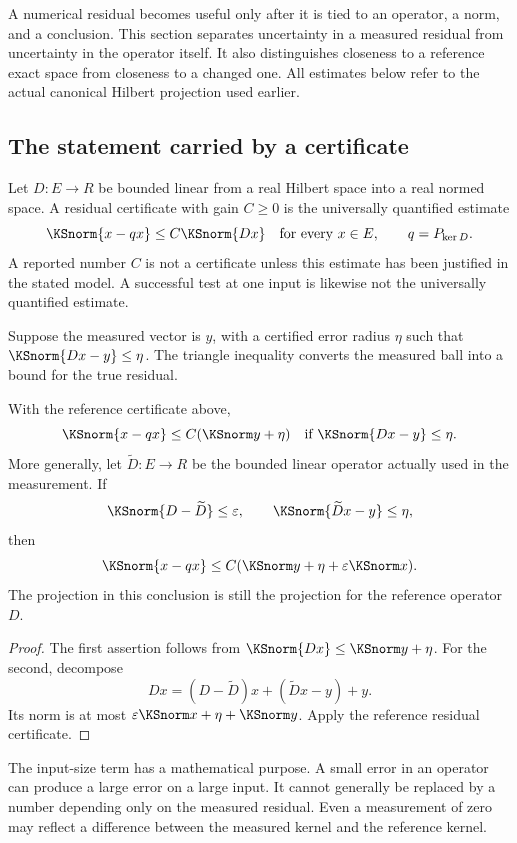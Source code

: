 \label{KS:sec:certificate-reading}
A numerical residual becomes useful only after it is tied to an operator, a norm, and a conclusion. This section separates uncertainty in a measured residual from uncertainty in the operator itself. It also distinguishes closeness to a reference exact space from closeness to a changed one. All estimates below refer to the actual canonical Hilbert projection used earlier.

\subsection{The statement carried by a certificate}
Let \(D:E\to R\) be bounded linear from a real Hilbert space into a real normed space. A residual certificate with gain \(C\ge0\) is the universally quantified estimate
\[
 \KSnorm{x-qx}\le C\KSnorm{Dx}\quad\text{for every }x\in E,
 \qquad q=P_{\ker D}.
\]
A reported number \(C\) is not a certificate unless this estimate has been justified in the stated model. A successful test at one input is likewise not the universally quantified estimate.

Suppose the measured vector is \(y\), with a certified error radius \(\eta\) such that \(\KSnorm{Dx-y}\le\eta\). The triangle inequality converts the measured ball into a bound for the true residual.

\begin{KSproposition}\label{KS:KS69}
With the reference certificate above,
\[
 \KSnorm{x-qx}\le C(\KSnorm y+\eta)
 \quad\text{if }\KSnorm{Dx-y}\le\eta.
\]
More generally, let \(\widetilde D:E\to R\) be the bounded linear operator actually used in the measurement. If
\[
 \KSnorm{D-\widetilde D}\le\varepsilon,
 \qquad\KSnorm{\widetilde D x-y}\le\eta,
\]
then
\begin{equation}\label{KS:eq:measured-reference}
 \KSnorm{x-qx}\le C(\KSnorm y+\eta+\varepsilon\KSnorm x).
\end{equation}
The projection in this conclusion is still the projection for the reference operator \(D\).
\end{KSproposition}
\begin{proof}
The first assertion follows from \(\KSnorm{Dx}\le\KSnorm y+\eta\). For the second, decompose
\[
 Dx=(D-\widetilde D)x+(\widetilde D x-y)+y.
\]
Its norm is at most \(\varepsilon\KSnorm x+\eta+\KSnorm y\). Apply the reference residual certificate.
\end{proof}
The input-size term has a mathematical purpose. A small error in an operator can produce a large error on a large input. It cannot generally be replaced by a number depending only on the measured residual. Even a measurement of zero may reflect a difference between the measured kernel and the reference kernel.


